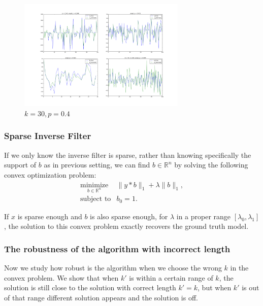 \documentclass[letter, 10pt]{article}
\numberwithin{equation}{section}
\begin{document}
\begin{figure}
\centering 
\label{fig:7}
\includegraphics[width=8cm,keepaspectratio]{fig2/bShort_k_lenKnown_xSparse_w_Gaus_AGauss_n100_k30_p0_40_sigma0_00.png}
\caption{$k=30, p=0.4$}
\end{figure}



\subsubsection{Sparse Inverse Filter}
If we only know the inverse filter is sparse, rather than knowing specifically the support of $b$ as in previous setting, we can find $b \in \mathbb{R}^n$ by solving  the following convex optimization problem:
 \begin{eqnarray*}
\underset{b\in \mathbb{R}^n}{\mbox{minimize}}& \|y*b\|_1+ \lambda \|b\|_1,\\
\mbox{subject to}& b_0 =1.
 \end{eqnarray*}

If $x$ is sparse enough and $b$ is also sparse enough, for $\lambda$ in a proper range $[\lambda_0, \lambda_1]$, the 
solution to this convex problem exactly recovers the ground truth model.


\subsubsection{The robustness of the algorithm with incorrect length}
Now we study how robust is the algorithm when we choose the wrong $k$ in the convex problem. We show that when $k'$ is within a certain range of $k$, the solution is still close to the solution with correct length $k'=k$, but when $k'$ is out of that range different solution appears and the solution is off. 
\end{document}

